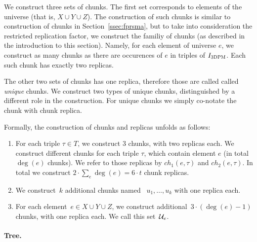 We construct three sets of chunks.
The first set corresponds to elements of the universe (that is, $X\cup Y\cup Z$).
The construction of such chunks is similar to construction of chunks in Section~\ref{ssec:fprsma}, but to take into consideration the restricted replication factor, we construct the familiy of chunks (as described in the introduction to this section).
Namely, for each element of universe $e$, we construct as many chunks as there are occurences of $e$ in triples of $I_{\mathrm{\textsc{3DPM}}}$.
Each such chunk has exactly two replicas.

The other two sets of chunks has one replica, therefore those are called called \emph{unique} chunks.
We construct two types of unique chunks, distinguished by a different role in the construction.
For unique chunks we simply co-notate the chunk with chunk replica.

Formally, the construction of chunks and replicas unfolds as follows:
\begin{enumerate}
  \item For each triple $\tau \in T$, we construct $3$ chunks, with two replicas each.
  We construct different chunks for each triple $\tau$, which contain element $e$ (in total $\deg(e)$ chunks).
  We refer to those replicas by $ch_1(e, \tau)$ and $ch_2(e, \tau)$.
  In total we construct $2\cdot \sum_e\deg(e) = 6\cdot t$ chunk replicas.
  \item We construct~$k$ additional chunks named
  ~$u_1, \ldots, u_k$ with one replica each.
  \item For each element~$e\in X\cup Y\cup Z$,
  we construct additional~$3\cdot(\deg(e) - 1)$ chunks, with one replica each.
  We call this set~${\mathcal{U}_e}$.
\end{enumerate}

\paragraph{Tree.}

